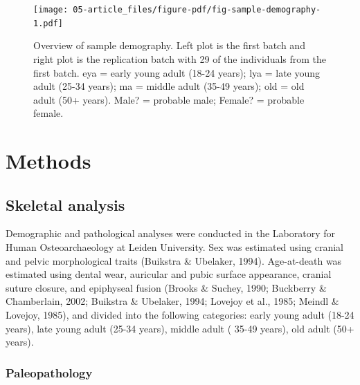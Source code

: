 \documentclass[
  letterpaper,
]{book}
\begin{document}
\begin{figure}

{\centering \texttt{[image: 05-article\_files/figure-pdf/fig-sample-demography-1.pdf]}

}

\caption{\label{fig-sample-demography}Overview of sample demography.
Left plot is the first batch and right plot is the replication batch
with 29 of the individuals from the first batch. eya = early young adult
(18-24 years); lya = late young adult (25-34 years); ma = middle adult
(35-49 years); old = old adult (50+ years). Male? = probable male;
Female? = probable female.}

\end{figure}

\hypertarget{methods}{%
\section{Methods}\label{methods}}

\hypertarget{skeletal-analysis}{%
\subsection{Skeletal analysis}\label{skeletal-analysis}}

Demographic and pathological analyses were conducted in the Laboratory
for Human Osteoarchaeology at Leiden University. Sex was estimated using
cranial and pelvic morphological traits (Buikstra \& Ubelaker, 1994).
Age-at-death was estimated using dental wear, auricular and pubic
surface appearance, cranial suture closure, and epiphyseal fusion
(Brooks \& Suchey, 1990; Buckberry \& Chamberlain, 2002; Buikstra \&
Ubelaker, 1994; Lovejoy et al., 1985; Meindl \& Lovejoy, 1985), and
divided into the following categories: early young adult (18-24 years),
late young adult (25-34 years), middle adult ( 35-49 years), old adult
(50+ years).

\hypertarget{paleopathology}{%
\subsubsection{Paleopathology}\label{paleopathology}}
\end{document}
